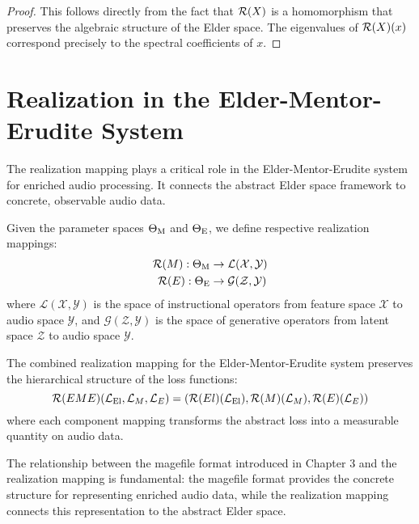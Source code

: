 \begin{proof}
This follows directly from the fact that $\mathcal{R}(X)$ is a homomorphism that preserves the algebraic structure of the Elder space. The eigenvalues of $\mathcal{R}(X)(x)$ correspond precisely to the spectral coefficients of $x$.
\end{proof}

\section{Realization in the Elder-Mentor-Erudite System}

The realization mapping plays a critical role in the Elder-Mentor-Erudite system for enriched audio processing. It connects the abstract Elder space framework to concrete, observable audio data.

\begin{definition}
Given the parameter spaces $\Theta_{\text{M}}$ and $\Theta_{\text{E}}$, we define respective realization mappings:
\begin{align}
\mathcal{R}(M): \Theta_{\text{M}} &\rightarrow \mathcal{L}(\mathcal{X}, \mathcal{Y}) \\
\mathcal{R}(E): \Theta_{\text{E}} &\rightarrow \mathcal{G}(\mathcal{Z}, \mathcal{Y})
\end{align}
where $\mathcal{L}(\mathcal{X}, \mathcal{Y})$ is the space of instructional operators from feature space $\mathcal{X}$ to audio space $\mathcal{Y}$, and $\mathcal{G}(\mathcal{Z}, \mathcal{Y})$ is the space of generative operators from latent space $\mathcal{Z}$ to audio space $\mathcal{Y}$.
\end{definition}

\begin{theorem}
The combined realization mapping for the Elder-Mentor-Erudite system preserves the hierarchical structure of the loss functions:
\begin{equation}
\mathcal{R}(EME)(\mathcal{L}_{\text{El}}, \mathcal{L}_M, \mathcal{L}_E) = (\mathcal{R}(El)(\mathcal{L}_{\text{El}}), \mathcal{R}(M)(\mathcal{L}_M), \mathcal{R}(E)(\mathcal{L}_E))
\end{equation}
where each component mapping transforms the abstract loss into a measurable quantity on audio data.
\end{theorem}

\begin{remark}
The relationship between the magefile format introduced in Chapter 3 and the realization mapping is fundamental: the magefile format provides the concrete structure for representing enriched audio data, while the realization mapping connects this representation to the abstract Elder space.
\end{remark}

